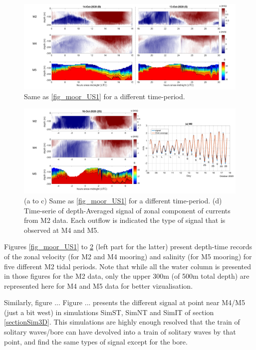 \begin{figure}[!h]
 \includegraphics[width=\textwidth]{./GBR3D/US_moorings2.png}
 \caption {Same as \ref{fig_moor_US1} for a different time-period.}
 \label{fig_moor_US2}
\end{figure}

\begin{figure}[!h]
 \includegraphics[width=\textwidth]{./GBR3D/US_moorings3.png}
 \caption {(a to c) Same as \ref{fig_moor_US1} for a different time-period. (d) Time-serie of depth-Averaged signal of zonal component of currents from M2 data. Each outflow is indicated the type of signal that is observed at M4 and M5.}
 \label{fig_moor_US3}
\end{figure}

Figures \ref{fig_moor_US1} to \ref{fig_moor_US3} (left part for the latter) present depth-time records of the zonal velocity (for M2 and M4 mooring) and salinity (for M5 mooring) for five different M2 tidal periods. Note that while all the water column is presented in those figures for the M2 data, only the upper 300m (of 500m total depth) are represented here for M4 and M5 data for better vizualisation.

Similarly, figure ... 
Figure ... presents the different signal at point near M4/M5 (just a bit west) in simulations SimST, SimNT and SimIT of section \ref{sectionSim3D}. This simulations are highly enough resolved that the train of solitary waves/bore can have devolved into a train of solitary waves by that point, and find the same types of signal except for the bore.


